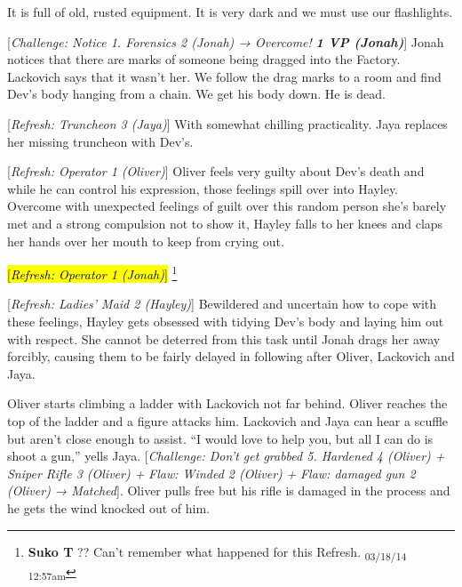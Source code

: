 It is full of old, rusted equipment.  It is very dark and we must use our flashlights.



{[}\textit{Challenge: Notice 1.  Forensics 2 (Jonah) → Overcome! }\textit{\textbf{1 VP (Jonah)}}{]}  Jonah notices that there are marks of someone being dragged into the Factory.  Lackovich says that it wasn't her.  We follow the drag marks to a room and find Dev's body hanging from a chain.  We get his body down. He is dead.



{[}\textit{Refresh: Truncheon 3 (Jaya)}{]}  With somewhat chilling practicality.  Jaya replaces her missing truncheon with Dev's.



{[}\textit{Refresh: Operator 1 (Oliver)}{]}  Oliver feels very guilty about Dev's death and while he can control his expression, those feelings spill over into Hayley.  Overcome with unexpected feelings of guilt over this random person she's barely met and a strong compulsion not to show it, Hayley falls to her knees and claps her hands over her mouth to keep from crying out.



\hl{{[}\textit{Refresh: Operator 1 (Jonah)}{]} }\footnote{\textbf{Suko T }?? Can't remember what happened for this Refresh. \textsubscript{03/18/14 12:57am}}



{[}\textit{Refresh: Ladies' Maid 2 (Hayley)}{]} Bewildered and uncertain how to cope with these feelings, Hayley gets obsessed with tidying Dev's body and laying him out with respect.  She cannot be deterred from this task until Jonah drags her away forcibly, causing them to be fairly delayed in following after Oliver, Lackovich and Jaya.



Oliver starts climbing a ladder with Lackovich not far behind.  Oliver reaches the top of the ladder and a figure attacks him.  Lackovich and Jaya can hear a scuffle but aren't close enough to assist.  ``I would love to help you, but all I can do is shoot a gun,'' yells Jaya.  {[}\textit{Challenge: Don't get grabbed 5.  Hardened 4 (Oliver) + Sniper Rifle 3 (Oliver) + }\textit{ {\color[RGB]{255,0,0}Flaw: Winded 2 (Oliver)} }\textit{ + }\textit{ {\color[RGB]{255,0,0}Flaw: damaged gun 2 (Oliver)} }\textit{ → Matched}{]}.  Oliver pulls free but his rifle is damaged in the process and he gets the wind knocked out of him.



